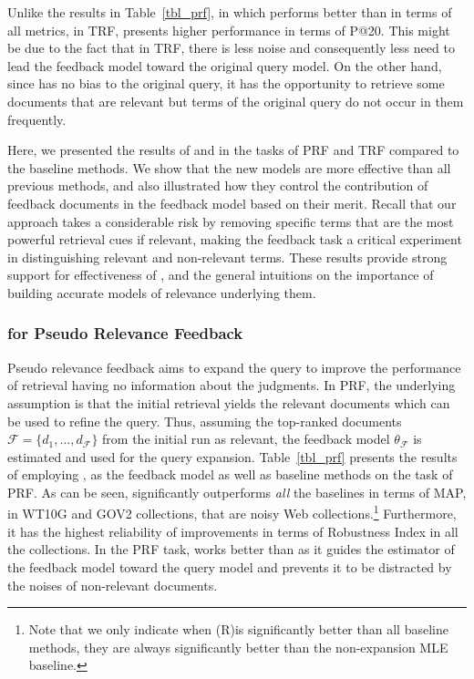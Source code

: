Unlike the results in Table~\ref{tbl_prf}, in which \acrswlm performs better than \acswlm in terms of all metrics, in TRF, \acswlm presents higher performance in terms of P@20. This might be due to the fact that in TRF, there is less noise and consequently less need to lead the feedback model toward the original query model. On the other hand, since \acrswlm has no bias to the original query, it has the opportunity to retrieve some documents that are relevant but terms of the original query do not occur in them frequently. 

\medskip
Here, we presented the results of \acswlm  and \acrswlm  in the tasks of PRF and TRF compared to the baseline methods.
We show that the new models are more effective than all previous methods, and also illustrated how they control the contribution of feedback documents in the feedback model based on their merit.
Recall that our approach takes a considerable risk by removing specific terms that are the most powerful retrieval cues if relevant, making the feedback task a critical experiment in distinguishing relevant and non-relevant terms. 
%
These results provide strong support for effectiveness of \swlms, and the general intuitions on the importance of building accurate models of relevance underlying them.



\subsubsection{\acswlm for Pseudo Relevance Feedback}
\label{sec:PRF}
Pseudo relevance feedback aims to expand the query to improve the performance of retrieval having no information about the judgments. In PRF, the underlying assumption is that the initial retrieval yields the relevant documents which can be used to refine the query. Thus, assuming the top-ranked documents $\mathcal{F} = \{d_1, \ldots ,d_{\mathcal{F}}\}$ from the initial run as relevant, the feedback model $\theta_{\mathcal{F}}$ is estimated and used for the query expansion.  
Table~\ref{tbl_prf} presents the results of employing \swlms, \rswlms as the feedback model as well as baseline methods on the task of PRF\@. 
As can be seen, \acrswlm significantly outperforms \emph{all} the baselines in terms of MAP, in WT10G and GOV2 collections, that are noisy Web collections.\footnote{Note that we only indicate when (R)\acswlm is significantly better than all baseline methods, they are always significantly better than the non-expansion MLE baseline.} Furthermore, it has the highest reliability of improvements in terms of Robustness Index in all the collections.
In the PRF task, \acrswlm works better than \acswlm as it guides the estimator of the feedback model toward the query model and prevents it to be distracted by the noises of non-relevant documents.

